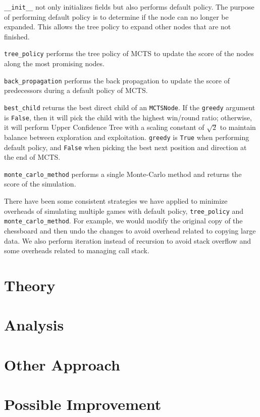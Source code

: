 \documentclass[twoside,11pt]{article}
\begin{document}
\texttt{\_\_init\_\_} not only initializes fields but also performs default policy.
The purpose of performing default policy is to determine if the node can no longer be expanded.
This allows the tree policy to expand other nodes that are not finished.

\texttt{tree\_policy} performs the tree policy of MCTS to update the score of the nodes along the most promising nodes.

\texttt{back\_propagation} performs the back propagation to update the score of predecessors during a default policy of MCTS.

\texttt{best\_child} returns the best direct child of an \texttt{MCTSNode}.
If the \texttt{greedy} argument is \texttt{False}, then it will pick the child with the highest win/round ratio;
otherwise, it will perform Upper Confidence Tree with a scaling constant of \(\sqrt{2}\) to maintain balance between exploration and exploitation.
\texttt{greedy} is \texttt{True} when performing default policy, and \texttt{False} when picking the best next position and direction at the end of MCTS.

\texttt{monte\_carlo\_method} performs a single Monte-Carlo method and returns the score of the simulation.

There have been some consistent strategies we have applied to minimize overheads of simulating multiple games with default policy, \texttt{tree\_policy} and \texttt{monte\_carlo\_method}.
For example, we would modify the original copy of the chessboard and then undo the changes to avoid overhead related to copying large data.
We also perform iteration instead of recursion to avoid stack overflow and some overheads related to managing call stack.

\section{Theory}

\section{Analysis}

\section{Other Approach}

\section{Possible Improvement}
\end{document}
